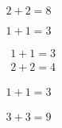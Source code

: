 \documentclass[leqno]{article}
\begin{document}
\begin{equation}
  2+2=8
\end{equation}

\[
  1+1=3
\]

\begin{subequations}
  \begin{align}
    & 1+1=3\\
    & 2+2=4
  \end{align}
\end{subequations}


\renewcommand{\theequation}{\Alph{equation}}
\begin{align}
  1+1=3
\end{align}

\begin{align}
  3+3=9
\end{align}
\end{document}
